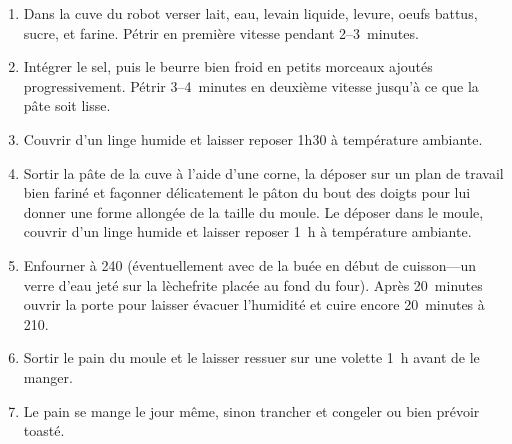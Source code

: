 
\begin{ingredients}
\end{ingredients}


\begin{recipe}
  \begin{enumerate}

  \item Dans la cuve du robot verser lait, eau, levain liquide,
    levure, oeufs battus, sucre, et farine.  Pétrir en première
    vitesse pendant 2--3~minutes.
    
  \item Intégrer le sel, puis le beurre bien froid en petits morceaux
    ajoutés progressivement.  Pétrir 3--4~minutes en deuxième vitesse
    jusqu'à ce que la pâte soit lisse.
    
  \item Couvrir d'un linge humide et laisser reposer 1h30 à
    température ambiante.
    
  \item Sortir la pâte de la cuve à l'aide d'une corne, la déposer sur
    un plan de travail bien fariné et façonner délicatement le pâton
    du bout des doigts pour lui donner une forme allongée de la taille
    du moule.  Le déposer dans le moule, couvrir d'un linge humide et
    laisser reposer 1~h à température ambiante.
    
  \item Enfourner à 240\degreeC{} (éventuellement avec de la buée en
    début de cuisson---un verre d'eau jeté sur la lèchefrite placée au
    fond du four).  Après 20~minutes ouvrir la porte pour laisser
    évacuer l'humidité et cuire encore 20~minutes à 210\degreeC.
    
  \item Sortir le pain du moule et le laisser ressuer sur une volette
    1~h avant de le manger.
    
  \item Le pain se mange le jour même, sinon trancher et congeler ou
    bien prévoir toasté.

  \end{enumerate}
\end{recipe}

